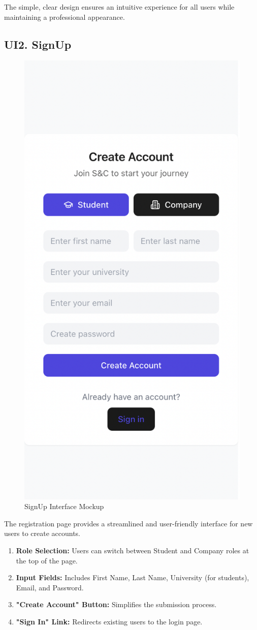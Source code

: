 The simple, clear design ensures an intuitive experience for all users while maintaining a professional appearance.

\subsection{UI2. SignUp}
\label{subsec:signup_ui}%

\begin{figure}[H]
    \begin{center}
        \includegraphics[width=0.52\linewidth]{JhaBhatiaSharma/imagesDD/SignUp.png}
        \caption{SignUp Interface Mockup}
        \label{fig:signupinterface}
    \end{center}
\end{figure}

The registration page provides a streamlined and user-friendly interface for new users to create accounts.

\begin{enumerate}
    \item \textbf{Role Selection:} Users can switch between Student and Company roles at the top of the page.
    \item \textbf{Input Fields:} Includes First Name, Last Name, University (for students), Email, and Password.
    \item \textbf{"Create Account" Button:} Simplifies the submission process.
    \item \textbf{"Sign In" Link:} Redirects existing users to the login page.
\end{enumerate}

